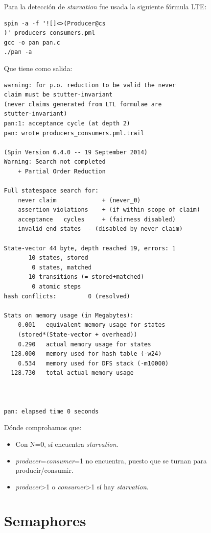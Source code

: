 \documentclass[a4paper,12pt]{article}
\begin{document}
Para la detección de \textit{starvation} fue usada la siguiente fórmula LTE: 

\begin{lstlisting}[frame=single]
spin -a -f '![]<>(Producer@cs
)' producers_consumers.pml
gcc -o pan pan.c
./pan -a
\end{lstlisting}
 
Que tiene como salida:

\begin{lstlisting}[frame=single]
warning: for p.o. reduction to be valid the never 
claim must be stutter-invariant
(never claims generated from LTL formulae are 
stutter-invariant)
pan:1: acceptance cycle (at depth 2)
pan: wrote producers_consumers.pml.trail

(Spin Version 6.4.0 -- 19 September 2014)
Warning: Search not completed
	+ Partial Order Reduction

Full statespace search for:
	never claim         	+ (never_0)
	assertion violations	+ (if within scope of claim)
	acceptance   cycles 	+ (fairness disabled)
	invalid end states	- (disabled by never claim)

State-vector 44 byte, depth reached 19, errors: 1
       10 states, stored
        0 states, matched
       10 transitions (= stored+matched)
        0 atomic steps
hash conflicts:         0 (resolved)

Stats on memory usage (in Megabytes):
    0.001	equivalent memory usage for states 
    (stored*(State-vector + overhead))
    0.290	actual memory usage for states
  128.000	memory used for hash table (-w24)
    0.534	memory used for DFS stack (-m10000)
  128.730	total actual memory usage



pan: elapsed time 0 seconds

\end{lstlisting}
Dónde comprobamos que:

\begin{itemize}
\item Con N=0, sí encuentra \textit{starvation}.
\item \textit{producer}=\textit{consumer}=1 no encuentra, puesto que se turnan para producir/consumir.
\item \textit{producer}\textgreater 1 o \textit{consumer}\textgreater 1 sí hay \textit{starvation}.
\end{itemize}


\section{Semaphores}
\end{document}
